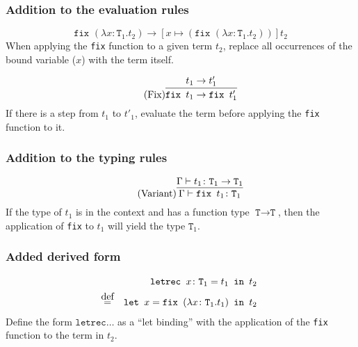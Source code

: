 \subsubsection{Addition to the evaluation rules \cite{pierce2002ProgLang}}
\begin{equation*}
    \tag{Fix Beta Reduction}
    \texttt{fix } (\lambda x \colon \texttt{T}_1 . t_2)
    \rightarrow
    [x \mapsto (\texttt{fix } (\lambda x \colon \texttt{T}_1 . t_2 ))]t_2
\end{equation*}
When applying the \texttt{fix} function to a given term $t_2$,
replace all occurrences of the bound variable ($x$) with the
term itself.

\begin{equation*}
    \tag{Fix}
    \infer{
        \texttt{fix } t_1 \rightarrow \texttt{fix } t'_1
    }{
        t_1 \rightarrow t'_1
    }
\end{equation*}
If there is a step from $t_1$ to $t'_1$, evaluate the term
before applying the \texttt{fix} function to it.

\subsubsection{Addition to the typing rules \cite{pierce2002ProgLang}}
\begin{equation*}
    \tag{Variant}
    \infer{
        \Gamma \vdash \texttt{fix } t_1 \colon \texttt{T}_1
    }{
        \Gamma \vdash t_1 \colon \texttt{T}_1 \rightarrow \texttt{T}_1
    }
\end{equation*}
If the type of $t_1$ is in the context and has a function type
$\texttt{T} \rightarrow \texttt{T}$, then the application of
\texttt{fix} to $t_1$ will yield the type $\texttt{T}_1$.

\subsubsection{Added derived form \cite{pierce2002ProgLang}}
\begin{equation*}
    \begin{split}
        \texttt{letrec } x \colon \texttt{T}_1 = t_1 \texttt{ in } t_2 \\
        \defeq \quad \texttt{let } x = \texttt{fix } (\lambda x \colon \texttt{T}_1 . t_1) \texttt{ in } t_2
    \end{split}
\end{equation*}
Define the form $\texttt{letrec} \dots$ as a ``let binding'' with the application of
the \texttt{fix} function to the term in $t_2$.
